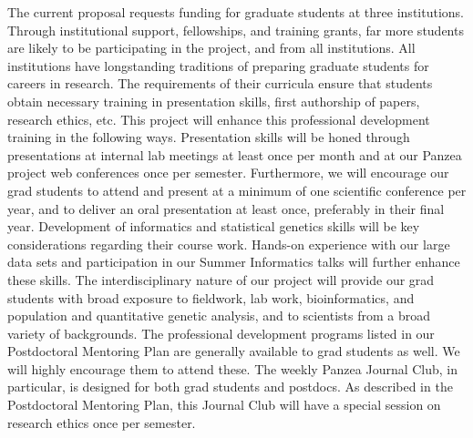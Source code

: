 The current proposal requests funding for graduate students at three institutions. Through institutional 
support, fellowships, and training grants, far more students are likely to be participating in the project, and 
from all institutions. All institutions have longstanding traditions of preparing graduate students for 
careers in research. The requirements of their curricula ensure that students obtain necessary training in 
presentation skills, first authorship of papers, research ethics, etc. This project will enhance this
professional development training in the following ways. Presentation skills will be honed through 
presentations at internal lab meetings at least once per month and at our Panzea project web conferences 
once per semester. Furthermore, we will encourage our grad students to attend and present at a minimum 
of one scientific conference per year, and to deliver an oral presentation at least once, preferably in their 
final year. Development of informatics and statistical genetics skills will be key considerations regarding 
their course work. Hands-on experience with our large data sets and participation in our Summer 
Informatics talks will further enhance these skills. The interdisciplinary nature of our project will provide 
our grad students with broad exposure to fieldwork, lab work, bioinformatics, and population and 
quantitative genetic analysis, and to scientists from a broad variety of backgrounds.
The professional development programs listed in our Postdoctoral Mentoring Plan are generally 
available to grad students as well. We will highly encourage them to attend these. The weekly Panzea 
Journal Club, in particular, is designed for both grad students and postdocs. As described in the 
Postdoctoral Mentoring Plan, this Journal Club will have a special session on research ethics once per 
semester.